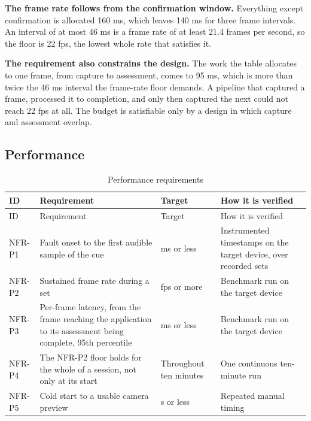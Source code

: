 \textbf{The frame rate follows from the confirmation window.} Everything except confirmation is allocated 160 ms, which leaves 140 ms for three frame intervals. An interval of at most 46 ms is a frame rate of at least 21.4 frames per second, so the floor is 22 fps, the lowest whole rate that satisfies it.

\textbf{The requirement also constrains the design.} The work the table allocates to one frame, from capture to assessment, comes to 95 ms, which is more than twice the 46 ms interval the frame-rate floor demands. A pipeline that captured a frame, processed it to completion, and only then captured the next could not reach 22 fps at all. The budget is satisfiable only by a design in which capture and assessment overlap.

\subsection{Performance}
\label{sec:3.4.2}

{\footnotesize
\setlength{\LTpre}{6pt}\setlength{\LTpost}{8pt}
\begin{longtable}{>{\raggedright\arraybackslash}p{}>{\raggedright\arraybackslash}p{}>{\raggedright\arraybackslash}p{}>{\raggedright\arraybackslash}p{}}
\caption{Performance requirements}\\
\toprule
ID & Requirement & Target & How it is verified \\
\midrule
\endfirsthead
\toprule
ID & Requirement & Target & How it is verified \\
\midrule
\endhead
\bottomrule
\endfoot
\bottomrule
\endlastfoot
NFR-P1 & Fault onset to the first audible sample of the cue & 300 ms or less & Instrumented timestamps on the target device, over recorded sets \\
NFR-P2 & Sustained frame rate during a set & 22 fps or more & Benchmark run on the target device \\
NFR-P3 & Per-frame latency, from the frame reaching the application to its assessment being complete, 95th percentile & 65 ms or less & Benchmark run on the target device \\
NFR-P4 & The NFR-P2 floor holds for the whole of a session, not only at its start & Throughout ten minutes & One continuous ten-minute run \\
NFR-P5 & Cold start to a usable camera preview & 3 s or less & Repeated manual timing \\
\end{longtable}
}

